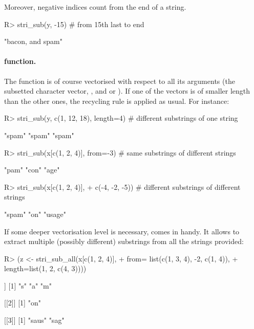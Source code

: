 \documentclass[nojss]{jss}\usepackage[]{graphicx}\usepackage[]{color}
\begin{document}
Moreover, negative indices count from the end of a string.

\begin{Schunk}
\begin{Sinput}
R> stri_sub(y, -15)           # from 15th last to end
\end{Sinput}
\begin{Soutput}
[1] "bacon, and spam"
\end{Soutput}
\end{Schunk}


\paragraph{ function.}
The   function is of course vectorised with respect
to all its arguments
(the subsetted character vector, , and  or ).
If one of the vectors is of smaller length than the other ones,
the recycling rule is applied as usual. For instance:

\begin{Schunk}
\begin{Sinput}
R> stri_sub(y, c(1, 12, 18), length=4) # different substrings of one string
\end{Sinput}
\begin{Soutput}
[1] "spam" "spam" "spam"
\end{Soutput}
\begin{Sinput}
R> stri_sub(x[c(1, 2, 4)], from=-3)    # same substrings of different strings
\end{Sinput}
\begin{Soutput}
[1] "pam" "con" "age"
\end{Soutput}
\begin{Sinput}
R> stri_sub(x[c(1, 2, 4)],
+    c(-4, -2, -5))  # different substrings of different strings
\end{Sinput}
\begin{Soutput}
[1] "spam"  "on"    "usage"
\end{Soutput}
\end{Schunk}

If some deeper vectorisation level is necessary, 
comes in handy. It allows to extract multiple (possibly different) substrings
from all the strings provided:


\begin{Schunk}
\begin{Sinput}
R> (z <- stri_sub_all(x[c(1, 2, 4)],
+    from=  list(c(1, 3, 4), -2, c(1, 4)),
+    length=list(1,           2, c(4, 3))))
\end{Sinput}
\begin{Soutput}
[[1]]
[1] "s" "a" "m"

[[2]]
[1] "on"

[[3]]
[1] "saus" "sag"
\end{Soutput}
\end{Schunk}
\end{document}
